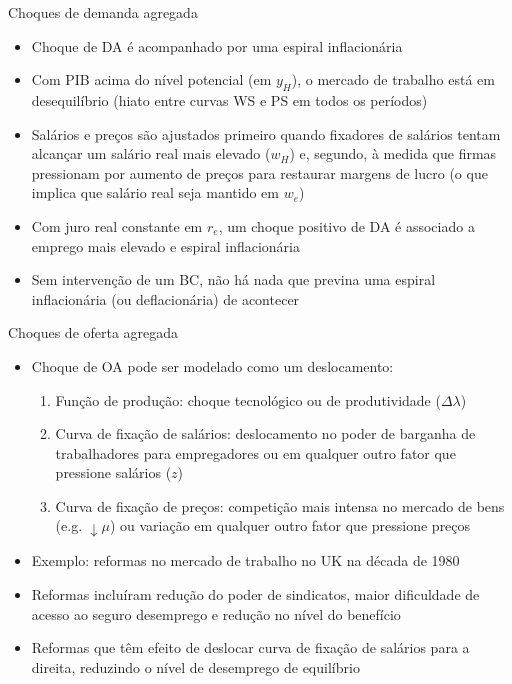 \documentclass[10pt]{beamer}
\begin{document}
\begin{frame}
    {Choques de demanda agregada}
    \begin{itemize}
        \item Choque de DA é acompanhado por uma espiral inflacionária\bigskip
        \item Com PIB acima do nível potencial (em $y_H$), o mercado de trabalho está em desequilíbrio (hiato entre curvas WS e PS em todos os períodos)\bigskip
        \item Salários e preços são ajustados primeiro quando fixadores de salários tentam alcançar um salário real mais elevado ($w_H$) e, segundo, à medida que firmas pressionam por aumento de preços para restaurar margens de lucro (o que implica que salário real seja mantido em $w_e$)\bigskip
        \item Com juro real constante em $r_e$, um choque positivo de DA é associado a emprego mais elevado e espiral inflacionária\bigskip
        \item Sem intervenção de um BC, não há nada que previna uma espiral inflacionária (ou deflacionária) de acontecer
    \end{itemize}
\end{frame}

\begin{frame}
    {Choques de oferta agregada}
    \begin{itemize}
        \item Choque de OA pode ser modelado como um deslocamento:\medskip
        \begin{enumerate}
            \item Função de produção: choque tecnológico ou de produtividade ($\Delta \lambda$)\medskip
            \item Curva de fixação de salários: deslocamento no poder de barganha de trabalhadores para empregadores ou em qualquer outro fator que pressione salários ($z$)\medskip
            \item Curva de fixação de preços: competição mais intensa no mercado de bens (e.g. $\downarrow \mu$) ou variação em qualquer outro fator que pressione preços\bigskip
        \end{enumerate}
        \item Exemplo: reformas no mercado de trabalho no UK na década de 1980\bigskip
        \item Reformas incluíram redução do poder de sindicatos, maior dificuldade de acesso ao seguro desemprego e redução no nível do benefício\bigskip
        \item Reformas que têm efeito de deslocar curva de fixação de salários para a direita, reduzindo o nível de desemprego de equilíbrio
    \end{itemize}
\end{frame}
\end{document}
